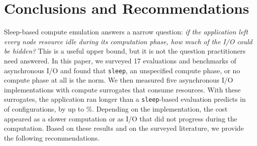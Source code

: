 \section{Conclusions and Recommendations}
\label{sec:conclusion}

Sleep-based compute emulation answers a narrow question: \emph{if the
application left every node resource idle during its computation phase, how
much of the I/O could be hidden?} This is a useful upper bound, but it is
not the question practitioners need answered. In this paper, we surveyed 17
evaluations and benchmarks of asynchronous I/O and found that \texttt{sleep},
an unspecified compute phase, or no compute phase at all is the norm. We then
measured five asynchronous I/O implementations with compute surrogates that
consume resources. With these surrogates, the application ran longer than a
\texttt{sleep}-based evaluation predicts in \ExcLongerFive of \ExcN
configurations, by up to \ExcMaxPct\%. Depending on the implementation, the
cost appeared as a slower computation or as I/O that did not progress during
the computation. Based on these results and on the surveyed literature, we
provide the following recommendations.

